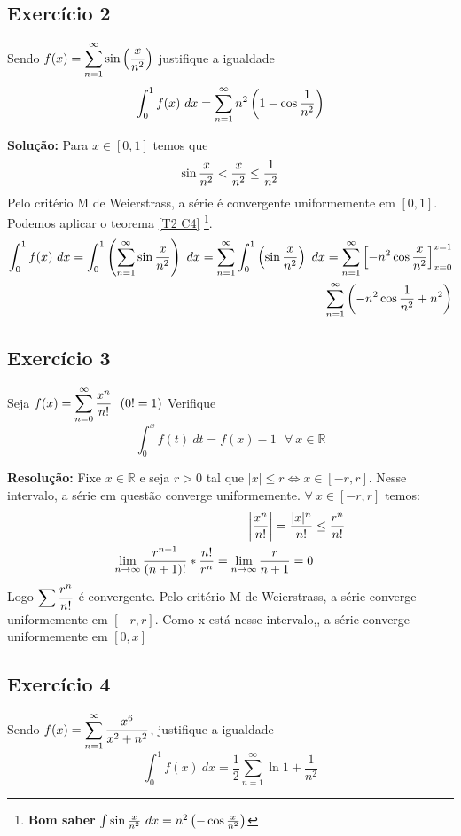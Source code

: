 \documentclass[12pt,openany, letterpaper]{book}
\newcommand{\LI}[1][n]{\lim_{{#1} \rightarrow \infty}}
\newcommand{\soma}[2][n]{\sum_{{#1} = #2}^\infty}
\newcommand{\E}[1]{Exercício #1}
\newcommand{\DS}{\displaystyle{}}
\begin{document}
\subsection*{\E{2}}{Sendo $\displaystyle{f(x) = \soma{1} \sin \left( {x \over n^2}\right)}$ justifique a igualdade $$\int_0^1 f(x) \ dx = \soma{1} n^2 \left(1 -\cos {1 \over n^2}\right)$$

\textbf{Solução:} Para $x \in [0,1]$ temos que $$\sin {x \over n^2} < {x \over n^2} \leq {1 \over n^2}$$ Pelo critério M de Weierstrass, a série é convergente uniformemente em $[0,1]$. Podemos aplicar o teorema \ref{T2 C4} \footnote{\textbf{Bom saber} $\int \sin{x \over n^2}\ dx = n^2 \left(-\cos{x \over n^2}\right)$}. \begin{align*}
\int_0^1 f(x) \ dx = \int_0^1 \left( \soma{1} \sin {x \over n^2} \right) \ dx = \soma{1} \int_0^1 \left( \sin {x \over n^2} \right) \ dx = \soma{1} \left[ -n^2 \cos{x \over n^2} \right]_{x = 0}^{x = 1}\\
\soma{1} \left( -n^2\cos{1 \over n^2} +n^2 \right)
\end{align*}

\subsection*{\E{3}}{Seja $\displaystyle{f(x) = \soma{0}  {x^n \over n!} \ \ (0! = 1)}$ Verifique $$\int_0^x f(t) \ dt = f(x) -1 \ \ \ \forall \ x \in \mathds{R}$$}

\textbf{Resolução:} Fixe $x \in \mathds{R}$ e seja $r > 0$ tal que $|x| \leq r \Longleftrightarrow x \in [-r,r]$. Nesse intervalo, a série em questão converge uniformemente. $\forall \ x \in [-r, r]$ temos: \begin{align*}
\left| \frac{x^n}{n!} \right| = {|x|^n \over n!} &\leq {r^n \over n!} \\
\LI {r^{n+1} \over (n+1)!}*{n! \over r^n} = \LI {r \over n+1} = 0
\end{align*} 
Logo $\DS{\sum {r^n \over n!}}$ é convergente. Pelo critério M de Weierstrass, a série converge uniformemente em $[-r,r]$. Como x está nesse  intervalo,, a série converge uniformemente em $[0,x]$

\subsection*{\E{4}}{Sendo $\displaystyle{f(x) = \soma{1}  {x^6 \over x^2+n^2}}$, justifique a igualdade $$\int_0^1 f(x) \ dx = \frac{1}{2}\soma{1}\ln{1+ \frac{1}{n^2}}$$}

}
\end{document}
